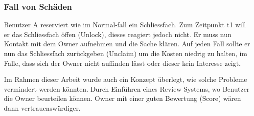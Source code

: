 \subsubsection{Fall von Schäden}
Benutzer A reserviert wie im Normal-fall ein Schliessfach. Zum Zeitpunkt t1 will er das Schliessfach öffen (Unlock), dieses reagiert jedoch nicht. Er muss nun Kontakt mit dem Owner aufnehmen und die Sache klären. Auf jeden Fall sollte er nun das Schliessfach zurückgeben (Unclaim) um die Kosten niedrig zu halten, im Falle, dass sich der Owner nicht auffinden lässt oder dieser kein Interesse zeigt.

Im Rahmen dieser Arbeit wurde auch ein Konzept überlegt, wie solche Probleme vermindert werden könnten. Durch Einführen eines Review Systems, wo Benutzer die Owner beurteilen können. Owner mit einer guten Bewertung (Score) wären dann vertrauenswürdiger.

